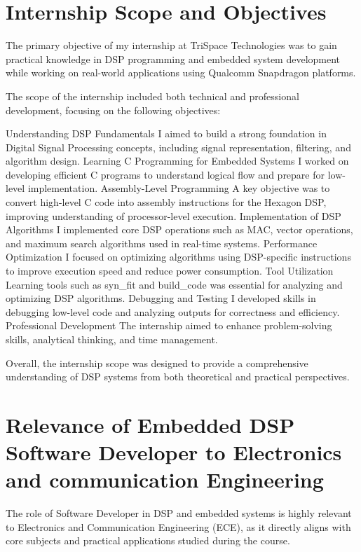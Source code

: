 \documentclass[12pt,a4paper]{report}
\begin{document}
\section{Internship Scope and Objectives}

The primary objective of my internship at TriSpace Technologies was to gain practical knowledge in DSP programming and embedded system development while working on real-world applications using Qualcomm Snapdragon platforms.


The scope of the internship included both technical and professional development, focusing on the following objectives:


Understanding DSP Fundamentals I aimed to build a strong foundation in Digital Signal Processing concepts, including signal representation, filtering, and algorithm design. Learning C Programming for Embedded Systems I worked on developing efficient C programs to understand logical flow and prepare for low-level implementation. Assembly-Level Programming A key objective was to convert high-level C code into assembly instructions for the Hexagon DSP, improving understanding of processor-level execution. Implementation of DSP Algorithms I implemented core DSP operations such as MAC, vector operations, and maximum search algorithms used in real-time systems. Performance Optimization I focused on optimizing algorithms using DSP-specific instructions to improve execution speed and reduce power consumption. Tool Utilization Learning tools such as syn\_fit and build\_code was essential for analyzing and optimizing DSP algorithms. Debugging and Testing I developed skills in debugging low-level code and analyzing outputs for correctness and efficiency. Professional Development The internship aimed to enhance problem-solving skills, analytical thinking, and time management.


Overall, the internship scope was designed to provide a comprehensive understanding of DSP systems from both theoretical and practical perspectives.


\section{Relevance of Embedded DSP Software Developer to Electronics and communication Engineering}

The role of Software Developer in DSP and embedded systems is highly relevant to Electronics and Communication Engineering (ECE), as it directly aligns with core subjects and practical applications studied during the course.
\end{document}

